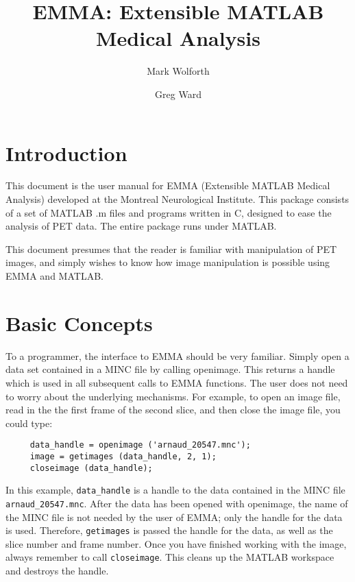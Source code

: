 
\title{EMMA: Extensible MATLAB Medical Analysis}
\author{Mark Wolforth \and Greg Ward}

\def\code#1{{\tt #1}}

 

\maketitle

\tableofcontents

\section{Introduction}

This document is the user manual for EMMA (Extensible MATLAB Medical
Analysis) developed at the Montreal Neurological Institute.  This
package consists of a set of MATLAB .m files and programs written in
C, designed to ease the analysis of PET data.  The entire package runs
under MATLAB.

This document presumes that the reader is familiar with manipulation
of PET images, and simply wishes to know how image manipulation is
possible using EMMA and MATLAB.


\newpage
\section{Basic Concepts}
\label{basic_concepts}

To a programmer, the interface to EMMA should be very familiar.
Simply open a data set contained in a MINC file by calling openimage.
This returns a handle which is used in all subsequent calls to EMMA
functions.  The user does not need to worry about the underlying
mechanisms.  For example, to open an image file, read in the the first
frame of the second slice, and then close the image file, you could
type:
%
\begin{verbatim}
     data_handle = openimage ('arnaud_20547.mnc');
     image = getimages (data_handle, 2, 1); 
     closeimage (data_handle);
\end{verbatim}
%
In this example, \verb+data_handle+ is a handle to the data contained
in the MINC file \verb+arnaud_20547.mnc+.  After the data has been
opened with openimage, the name of the MINC file is not needed by the
user of EMMA; only the handle for the data is used.  Therefore,
\verb+getimages+ is passed the handle for the data, as well as the
slice number and frame number.  Once you have finished working with
the image, always remember to call \verb+closeimage+.  This cleans up
the MATLAB workspace and destroys the handle.

